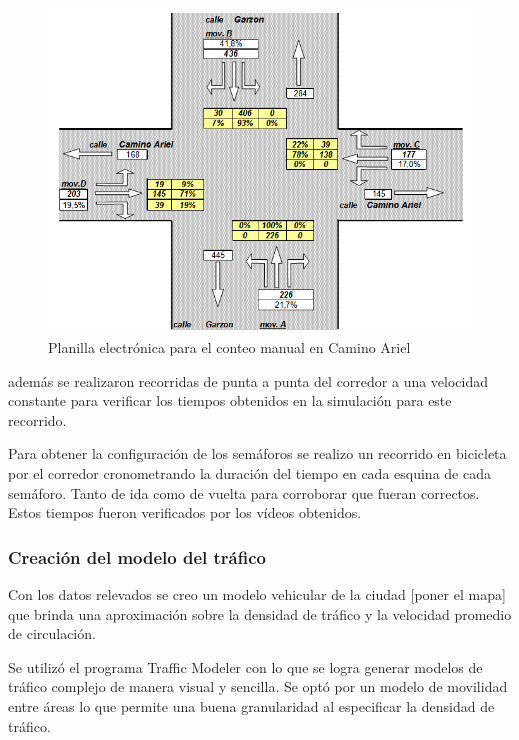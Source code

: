 \begin{figure}[H]
\centering
\includegraphics[width=0.7\linewidth]{Figures/conteo_hoja}
\caption{Planilla electrónica para el conteo manual en Camino Ariel}
\label{fig:conteo_hoja}
\end{figure}


además se realizaron recorridas de punta a punta del corredor a una velocidad constante para verificar los tiempos obtenidos en la simulación para este recorrido.

Para obtener la configuración de los semáforos se realizo un recorrido en bicicleta por el corredor cronometrando la duración del tiempo en cada esquina de cada semáforo. Tanto de ida como de vuelta para corroborar que fueran correctos. Estos tiempos fueron verificados por los vídeos obtenidos.


\newpage
\subsubsection{Creación del modelo del tráfico}

Con los datos relevados se creo un modelo vehicular de la ciudad [poner el mapa] que brinda una aproximación sobre la densidad de tráfico y la velocidad promedio de circulación.

Se utilizó el programa Traffic Modeler \citep{TrafficModeler} con lo que se logra generar modelos de tráfico complejo de manera visual y sencilla. Se optó por un modelo de movilidad entre áreas lo que permite una buena granularidad al especificar la densidad de tráfico.


